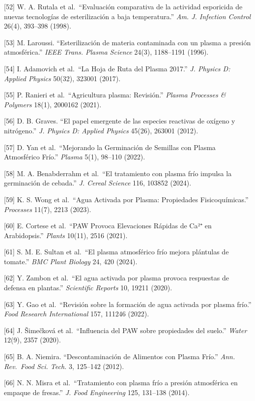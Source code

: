 \documentclass[
]{article}
\begin{document}
{[}52{]} W. A. Rutala et al.~``Evaluación comparativa de la actividad
esporicida de nuevas tecnologías de esterilización a baja temperatura.''
\emph{Am. J. Infection Control} 26(4), 393--398 (1998).

{[}53{]} M. Laroussi. ``Esterilización de materia contaminada con un
plasma a presión atmosférica.'' \emph{IEEE Trans. Plasma Science} 24(3),
1188--1191 (1996).

{[}54{]} I. Adamovich et al.~``La Hoja de Ruta del Plasma 2017.''
\emph{J. Physics D: Applied Physics} 50(32), 323001 (2017).

{[}55{]} P. Ranieri et al.~``Agricultura plasma: Revisión.''
\emph{Plasma Processes \& Polymers} 18(1), 2000162 (2021).

{[}56{]} D. B. Graves. ``El papel emergente de las especies reactivas de
oxígeno y nitrógeno.'' \emph{J. Physics D: Applied Physics} 45(26),
263001 (2012).

{[}57{]} D. Yan et al.~``Mejorando la Germinación de Semillas con Plasma
Atmosférico Frío.'' \emph{Plasma} 5(1), 98--110 (2022).

{[}58{]} M. A. Benabderrahm et al.~``El tratamiento con plasma frío
impulsa la germinación de cebada.'' \emph{J. Cereal Science} 116, 103852
(2024).

{[}59{]} K. S. Wong et al.~``Agua Activada por Plasma: Propiedades
Fisicoquímicas.'' \emph{Processes} 11(7), 2213 (2023).

{[}60{]} E. Cortese et al.~``PAW Provoca Elevaciones Rápidas de Ca²⁺ en
Arabidopsis.'' \emph{Plants} 10(11), 2516 (2021).

{[}61{]} S. M. E. Sultan et al.~``El plasma atmosférico frío mejora
plántulas de tomate.'' \emph{BMC Plant Biology} 24, 420 (2024).

{[}62{]} Y. Zambon et al.~``El agua activada por plasma provoca
respuestas de defensa en plantas.'' \emph{Scientific Reports} 10, 19211
(2020).

{[}63{]} Y. Gao et al.~``Revisión sobre la formación de agua activada
por plasma frío.'' \emph{Food Research International} 157, 111246
(2022).

{[}64{]} J. Šimečková et al.~``Influencia del PAW sobre propiedades del
suelo.'' \emph{Water} 12(9), 2357 (2020).

{[}65{]} B. A. Niemira. ``Descontaminación de Alimentos con Plasma
Frío.'' \emph{Ann. Rev.~Food Sci. Tech.} 3, 125--142 (2012).

{[}66{]} N. N. Misra et al.~``Tratamiento con plasma frío a presión
atmosférica en empaque de fresas.'' \emph{J. Food Engineering} 125,
131--138 (2014).
\end{document}

